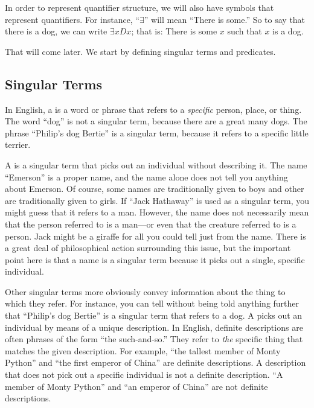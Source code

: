 In order to represent quantifier structure, we will also have symbols that represent quantifiers. For instance, ``$\exists$'' will mean ``There is some\blank.'' So to say that there is a dog, we can write $\exists x Dx$; that is: There is some $x$ such that $x$ is a dog.

That will come later. We start by defining singular terms and predicates.


\subsection{Singular Terms}




In English, a  is a word or phrase that refers to a \emph{specific} person, place, or thing. The word ``dog'' is not a singular term, because there are a great many dogs. The phrase ``Philip's dog Bertie'' is a singular term, because it refers to a specific little terrier.

A  is a singular term that picks out an individual without describing it. The name ``Emerson'' is a proper name, and the name alone does not tell you anything about Emerson. Of course, some names are traditionally given to boys and other are traditionally given to girls. If ``Jack Hathaway'' is used as a singular term, you might guess that it refers to a man. However, the name does not necessarily mean that the person referred to is a man---or even that the creature referred to is a person. Jack might be a giraffe for all you could tell just from the name. There is a great deal of philosophical action surrounding this issue, but the important point here is that a name is a singular term because it picks out a single, specific individual.

Other singular terms more obviously convey information about the thing to which they refer. For instance, you can tell without being told anything further that ``Philip's dog Bertie'' is a singular term that refers to a dog. A  picks out an individual by means of a unique description. In English, definite descriptions are often phrases of the form ``the such-and-so.'' They refer to \emph{the} specific thing that matches the given description. For example, ``the tallest member of Monty Python'' and ``the first emperor of China'' are definite descriptions. A description that does not pick out a specific individual is not a definite description. ``A member of Monty Python'' and ``an emperor of China'' are not definite descriptions.

